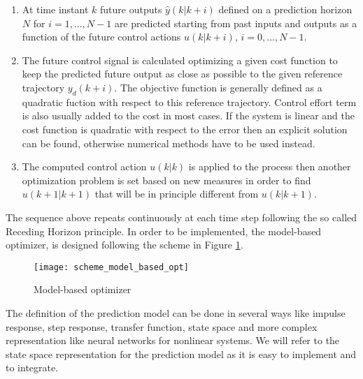 \begin{enumerate}
\item At time instant $k$ future outputs $\hat{y}(k|k+i)$ defined on a prediction horizon $N$ for $i=1,...,N-1$ are predicted starting from past inputs and outputs as a function of the future control actions $u(k|k+i)$, $i=0,...,N-1$.
\item The future control signal is calculated optimizing a given cost function to keep the predicted future output as close as possible to the given reference trajectory $y_d(k+i)$. The objective function is generally defined as a quadratic fuction with respect to this reference trajectory. Control effort term is also usually added to the cost in most cases. If the system is linear and the cost function is quadratic with respect to the error then an explicit solution can be found, otherwise numerical methods have to be used instead.
\item The computed control action $u(k|k)$ is applied to the process then another optimization problem is set based on new measures in order to find $u(k+1|k+1)$ that will be in principle different from $u(k|k+1)$. 
\end{enumerate}
The sequence above repeats continuously at each time step following the so called Receding Horizon principle. In order to be implemented, the model-based optimizer, is designed following the scheme in Figure \ref{scheme_model_based_opt}. 
\begin{figure}[h!]
	\centering
	\texttt{[image: scheme\_model\_based\_opt]}
	\caption{Model-based optimizer}
	\label{scheme_model_based_opt}
\end{figure}
The definition of the prediction model can be done in several ways like impulse response, step response, transfer function, state space and more complex representation like neural networks for nonlinear systems. We will refer to the state space representation for the prediction model as it is easy to implement and to integrate.

